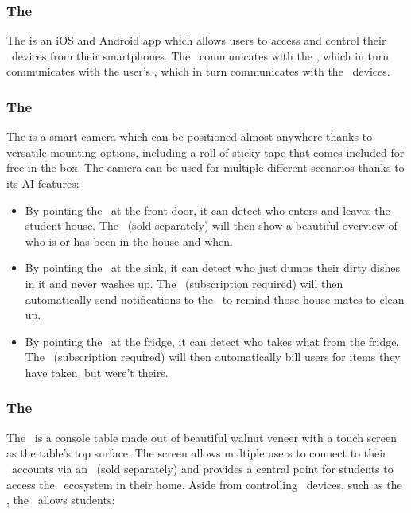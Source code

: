 \subsubsection*{The \sshApp}

The \emph{\sshApp} is an iOS and Android app which allows users to access and control their \ssh\ devices from their smartphones. The \sshApp\ communicates with the \sshCloud, which in turn communicates with the user's \sshHub, which in turn communicates with the \ssh\ devices.

\subsubsection{The \sshCamera}

The \emph{\sshCamera} is a smart camera which can be positioned almost anywhere thanks to versatile mounting options, including a roll of sticky tape that comes included for free in the box. The camera can be used for multiple different scenarios thanks to its AI features:

\begin{itemize}
    \item By pointing the \sshCamera\ at the front door, it can detect who enters and leaves the student house. The \sshConsole\ (sold separately) will then show a beautiful overview of who is or has been in the house and when.
    \item By pointing the \sshCamera\ at the sink, it can detect who just dumps their dirty dishes in it and never washes up. The \sshCloud\ (subscription required) will then automatically send notifications to the \sshApp\ to remind those house mates to clean up.
    \item By pointing the \sshCamera\ at the fridge, it can detect who takes what from the fridge. The \sshCloud\ (subscription required) will then automatically bill users for items they have taken, but were't theirs.
\end{itemize}

\subsubsection{The \sshConsole}

The \emph{\sshConsole}\ is a console table made out of beautiful walnut veneer with a touch screen as the table's top surface. The screen allows multiple users to connect to their \ssh\ accounts via an \sshHub\ (sold separately) and provides a central point for students to access the \ssh\ ecosystem in their home. Aside from controlling \ssh\ devices, such as the \sshCamera, the \sshConsole\ allows students:

